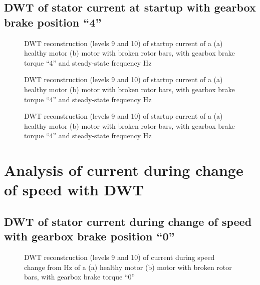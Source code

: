 \documentclass[a4paper,11pt]{report}
\begin{document}
\clearpage
\subsection{DWT of stator current at startup with gearbox brake position ``4''}

\begin{figure}[htbp]
\centering
\subfigure[]{\texttt{[image: h430st]}}
\subfigure[]{\texttt{[image: b430st]}}
\caption{DWT reconstruction (levels 9 and 10) of startup current of a (a) healthy motor (b) motor with broken rotor bars, with gearbox brake torque ``4'' and steady-state frequency \unit[30]{Hz}} \label{hb430st}
\end{figure}

\begin{figure}[htbp]
\centering
\subfigure[]{\texttt{[image: h440st]}}
\subfigure[]{\texttt{[image: b440st]}}
\caption{DWT reconstruction (levels 9 and 10) of startup current of a (a) healthy motor (b) motor with broken rotor bars, with gearbox brake torque ``4'' and steady-state frequency \unit[40]{Hz}} \label{hb440st}
\end{figure}

\begin{figure}[htbp]
\centering
\subfigure[]{\texttt{[image: h450st]}}
\subfigure[]{\texttt{[image: b450st]}}
\caption{DWT reconstruction (levels 9 and 10) of startup current of a (a) healthy motor (b) motor with broken rotor bars, with gearbox brake torque ``4'' and steady-state frequency \unit[50]{Hz}} \label{hb450st}
\end{figure}

\clearpage
\section{Analysis of current during change of speed with DWT}
\subsection{DWT of stator current during change of speed with gearbox brake position ``0''}

\begin{figure}[htbp]
\centering
\subfigure[]{\texttt{[image: h030sc]}}
\subfigure[]{\texttt{[image: b030sc]}}
\caption{DWT reconstruction (levels 9 and 10) of current during speed change from \unit[30]{Hz} of a (a) healthy motor (b) motor with broken rotor bars, with gearbox brake torque ``0''} \label{hb030sc}
\end{figure}
\end{document}

